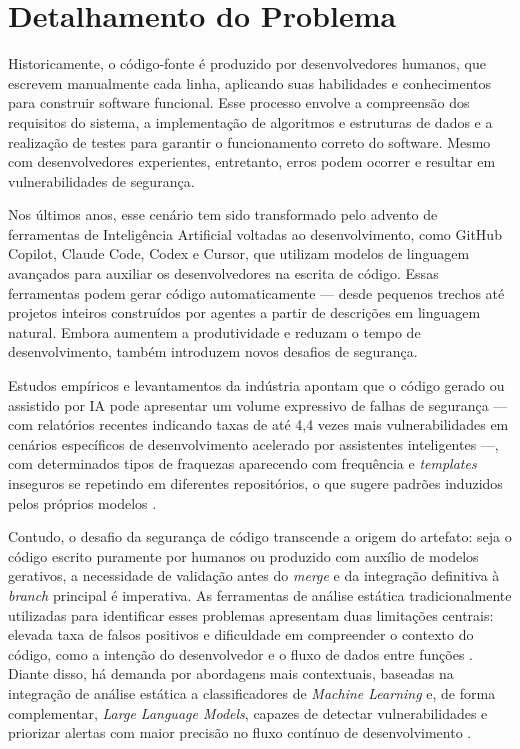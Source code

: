 \chapter{Detalhamento do Problema}
\label{cap:problema}

Historicamente, o código-fonte é produzido por desenvolvedores humanos,
que escrevem manualmente cada linha, aplicando suas habilidades e
conhecimentos para construir software funcional. Esse processo envolve
a compreensão dos requisitos do sistema, a implementação de algoritmos e
estruturas de dados e a realização de testes para garantir o
funcionamento correto do software. Mesmo com desenvolvedores experientes,
entretanto, erros podem ocorrer e resultar em vulnerabilidades de
segurança.

Nos últimos anos, esse cenário tem sido transformado pelo advento de
ferramentas de Inteligência Artificial voltadas ao desenvolvimento, como
GitHub Copilot, Claude Code, Codex e Cursor, que utilizam modelos de
linguagem avançados para auxiliar os desenvolvedores na escrita de
código. Essas ferramentas podem gerar código automaticamente — desde
pequenos trechos até projetos inteiros construídos por agentes a partir
de descrições em linguagem natural. Embora aumentem a produtividade e
reduzam o tempo de desenvolvimento, também introduzem novos desafios de
segurança.

Estudos empíricos e levantamentos da indústria apontam que o código gerado ou assistido por IA pode apresentar um volume expressivo de falhas de segurança --- com relatórios recentes indicando taxas de até 4,4 vezes mais vulnerabilidades em cenários específicos de desenvolvimento acelerado por assistentes inteligentes ---, com determinados tipos de fraquezas aparecendo com frequência e \textit{templates} inseguros se repetindo em diferentes repositórios, o que sugere padrões induzidos pelos próprios modelos \cite{stateofcyber2026,wu2025}. 

Contudo, o desafio da segurança de código transcende a origem do artefato: seja o código escrito puramente por humanos ou produzido com auxílio de modelos gerativos, a necessidade de validação antes do \textit{merge} e da integração definitiva à \textit{branch} principal é imperativa. As ferramentas de análise estática tradicionalmente utilizadas para identificar esses problemas apresentam duas limitações centrais: elevada taxa de falsos positivos e dificuldade em compreender o contexto do código, como a intenção do desenvolvedor e o fluxo de dados entre funções \cite{yang2025,techscience2025}. Diante disso, há demanda por abordagens mais contextuais, baseadas na integração de análise estática a classificadores de \textit{Machine Learning} e, de forma complementar, \textit{Large Language Models}, capazes de detectar vulnerabilidades e priorizar alertas com maior precisão no fluxo contínuo de desenvolvimento \cite{wang2025,mdpi2026}.

